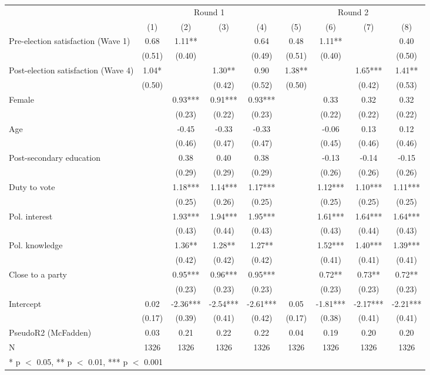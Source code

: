 \begin{tabular}[t]{lcccccccc}
\toprule
  & \multicolumn{4}{c|}{Round 1} & \multicolumn{4}{c}{Round 2} \\
  & (1) & (2) & (3) & (4) & (5) & (6) & (7) & (8) \\
\midrule
Pre-election satisfaction (Wave 1) & 0.68 & 1.11** &  & 0.64 & 0.48 & 1.11** &  & 0.40\\
 & (0.51) & (0.40) &  & (0.49) & (0.51) & (0.40) &  & (0.50)\\
Post-election satisfaction (Wave 4) & 1.04* &  & 1.30** & 0.90 & 1.38** &  & 1.65*** & 1.41**\\
 & (0.50) &  & (0.42) & (0.52) & (0.50) &  & (0.42) & (0.53)\\
Female &  & 0.93*** & 0.91*** & 0.93*** &  & 0.33 & 0.32 & 0.32\\
 &  & (0.23) & (0.22) & (0.23) &  & (0.22) & (0.22) & (0.22)\\
Age &  & -0.45 & -0.33 & -0.33 &  & -0.06 & 0.13 & 0.12\\
 &  & (0.46) & (0.47) & (0.47) &  & (0.45) & (0.46) & (0.46)\\
Post-secondary education &  & 0.38 & 0.40 & 0.38 &  & -0.13 & -0.14 & -0.15\\
 &  & (0.29) & (0.29) & (0.29) &  & (0.26) & (0.26) & (0.26)\\
Duty to vote &  & 1.18*** & 1.14*** & 1.17*** &  & 1.12*** & 1.10*** & 1.11***\\
 &  & (0.25) & (0.26) & (0.25) &  & (0.25) & (0.25) & (0.25)\\
Pol. interest &  & 1.93*** & 1.94*** & 1.95*** &  & 1.61*** & 1.64*** & 1.64***\\
 &  & (0.43) & (0.44) & (0.43) &  & (0.43) & (0.44) & (0.43)\\
Pol. knowledge &  & 1.36** & 1.28** & 1.27** &  & 1.52*** & 1.40*** & 1.39***\\
 &  & (0.42) & (0.42) & (0.42) &  & (0.41) & (0.41) & (0.41)\\
Close to a party &  & 0.95*** & 0.96*** & 0.95*** &  & 0.72** & 0.73** & 0.72**\\
 &  & (0.23) & (0.23) & (0.23) &  & (0.23) & (0.23) & (0.23)\\
Intercept & 0.02 & -2.36*** & -2.54*** & -2.61*** & 0.05 & -1.81*** & -2.17*** & -2.21***\\
 & (0.17) & (0.39) & (0.41) & (0.42) & (0.17) & (0.38) & (0.41) & (0.41)\\
\midrule
PseudoR2 (McFadden) & 0.03 & 0.21 & 0.22 & 0.22 & 0.04 & 0.19 & 0.20 & 0.20\\
N & 1326 & 1326 & 1326 & 1326 & 1326 & 1326 & 1326 & 1326\\
\bottomrule
\multicolumn{9}{l}{\rule{0pt}{1em}* p $<$ 0.05, ** p $<$ 0.01, *** p $<$ 0.001}\\
\end{tabular}
